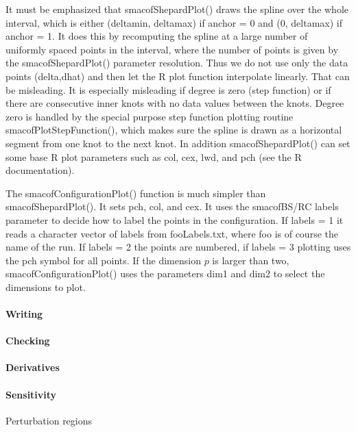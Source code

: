 \documentclass[
  12pt,
]{article}
\begin{document}
It must be emphasized that smacofShepardPlot() draws the spline
over the whole interval, which is either (deltamin, deltamax)
if anchor = 0 and (0, deltamax) if anchor = 1. It does
this by recomputing the spline at a large number of
uniformly spaced points in the interval, where the
number of points is given by the smacofShepardPlot()
parameter resolution. Thus we do not use only the
data points (delta,dhat) and then let the R plot function
interpolate linearly. That can be misleading. It is
especially misleading if degree is zero (step function)
or if there are consecutive inner knots with no data values
between the knots. Degree zero is handled by the special
purpose step function plotting routine smacofPlotStepFunction(),
which makes sure the spline is drawn as a horizontal segment
from one knot to the next knot. In addition smacofShepardPlot()
can set some base R plot parameters such as col, cex, lwd, and pch
(see the R documentation).

The smacofConfigurationPlot() function is much simpler than
smacofShepardPlot(). It sets pch, col, and cex. It uses
the smacofBS/RC labels parameter to decide how to label
the points in the configuration. If labels = 1 it reads
a character vector of labels from fooLabels.txt, where
foo is of course the name of the run. If labels = 2
the points are numbered, if labels = 3 plotting uses
the pch symbol for all points. If the dimension \(p\)
is larger than two, smacofConfigurationPlot() uses
the parameters dim1 and dim2 to select the dimensions
to plot.

\paragraph{Writing}\label{writing}

\paragraph{Checking}\label{checking}

\paragraph{Derivatives}\label{derivatives}

\paragraph{Sensitivity}\label{sensitivity}

Perturbation regions
\end{document}
